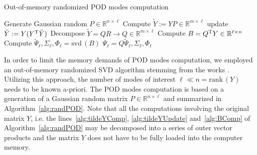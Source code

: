 \begin{algorithm}[H]
    \centering
    \caption{Out-of-memory randomized POD modes computation}
    \label{alg:randPOD}
    \begin{algorithmic}[1]
        \State Generate Gaussian random $P\in\mathbb{R}^{n\times \ell}$
        \State Compute $\tilde{Y} := YP \in\mathbb{R}^{m\times \ell}$\label{alg:tildeYComp}
        \State update $\tilde{Y}:= Y (Y^{\mathrm{T}}\tilde{Y})$\label{alg:tildeYUpdate}
        \EndFor
        \State Decompose $\tilde{Y} = QR\rightarrow Q\in\mathbb{R}^{m\times \ell}$
        \State Compute $B = Q^{\mathrm{T}}Y\in\mathbb{R}^{\ell\times n}$\label{alg:BComp}
        \State Compute $\tilde{\Psi}_{\ell},\Sigma_{\ell},\Phi_{\ell} = \mathrm{svd}\,(B)$
        \Statex\Return $\Psi_{\ell} = Q\tilde{\Psi}_{\ell},\Sigma_{\ell},\Phi_{\ell}$
    \end{algorithmic}
\end{algorithm}
In order to limit the memory demands of POD modes computation, we employed an out-of-memory randomized SVD algorithm stemming from the works \citep{rokhlin2009,halko2011,gu2015}. Utilizing this approach, the number of modes of interest $\ell \ll n = \mathrm{rank}\,(Y)$ needs to be known a-priori. The POD modes computation is based on a generation of a Gaussian random matrix $P\in\mathbb{R}^{n\times \ell}$ and summarized in Algorithm~\ref{alg:randPOD}. Note that all the computations involving the original matrix $Y$, i.e. the lines~\ref{alg:tildeYComp}, \ref{alg:tildeYUpdate} and~\ref{alg:BComp} of Algorithm~\ref{alg:randPOD} may be decomposed into a series of outer vector products and the matrix $Y$ does not have to be fully loaded into the computer memory.


